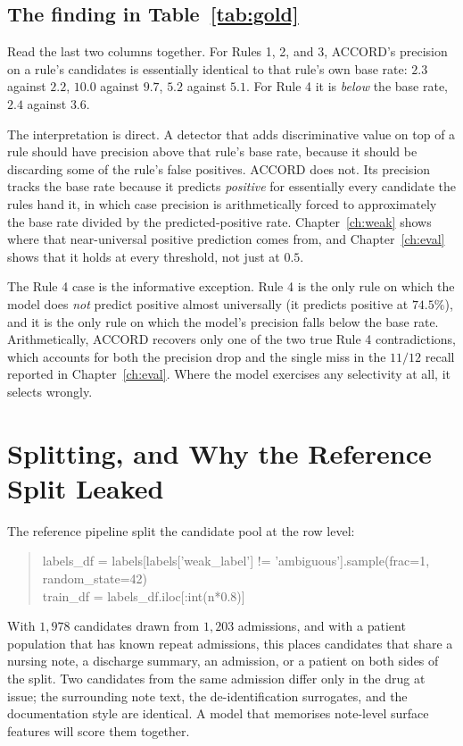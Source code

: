 \subsection{The finding in Table~\ref{tab:gold}}

Read the last two columns together. For Rules 1, 2, and 3, ACCORD's precision on
a rule's candidates is essentially identical to that rule's own base rate:
$2.3$ against $2.2$, $10.0$ against $9.7$, $5.2$ against $5.1$. For Rule 4 it is
\emph{below} the base rate, $2.4$ against $3.6$.

The interpretation is direct. A detector that adds discriminative value on top
of a rule should have precision above that rule's base rate, because it should
be discarding some of the rule's false positives. ACCORD does not. Its precision
tracks the base rate because it predicts \emph{positive} for essentially every
candidate the rules hand it, in which case precision is arithmetically forced to
approximately the base rate divided by the predicted-positive rate.
Chapter~\ref{ch:weak} shows where that near-universal positive prediction comes
from, and Chapter~\ref{ch:eval} shows that it holds at every threshold, not just
at $0.5$.

The Rule 4 case is the informative exception. Rule 4 is the only rule on which
the model does \emph{not} predict positive almost universally (it predicts
positive at $74.5\%$), and it is the only rule on which the model's precision
falls below the base rate. Arithmetically, ACCORD recovers only one of the two
true Rule 4 contradictions, which accounts for both the precision drop and the
single miss in the $11/12$ recall reported in Chapter~\ref{ch:eval}. Where the
model exercises any selectivity at all, it selects wrongly.

\section{Splitting, and Why the Reference Split Leaked}
\label{sec:splits}

The reference pipeline split the candidate pool at the row level:

\begin{quote}\ttfamily\small
labels\_df = labels[labels['weak\_label'] != 'ambiguous'].sample(frac=1, random\_state=42) \\
train\_df = labels\_df.iloc[:int(n*0.8)]
\end{quote}

With $1{,}978$ candidates drawn from $1{,}203$ admissions, and with a patient
population that has known repeat admissions, this places candidates that share a
nursing note, a discharge summary, an admission, or a patient on both sides of
the split. Two candidates from the same admission differ only in the drug at
issue; the surrounding note text, the de-identification surrogates, and the
documentation style are identical. A model that memorises note-level surface
features will score them together.

